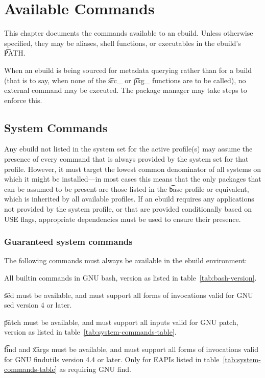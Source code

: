 \chapter{Available Commands}

This chapter documents the commands available to an ebuild. Unless otherwise specified, they may be
aliases, shell functions, or executables in the ebuild's \t{PATH}.

When an ebuild is being sourced for metadata querying rather than for a build (that is to say,
when none of the \t{src_} or \t{pkg_} functions are to be called), no external command may
be executed. The package manager may take steps to enforce this.

\section{System Commands}

Any ebuild not listed in the system set for the active profile(s) may assume the presence of every
command that is always provided by the system set for that profile. However, it must target the
lowest common denominator of all systems on which it might be installed---in most cases this means
that the only packages that can be assumed to be present are those listed in the \t{base} profile or
equivalent, which is inherited by all available profiles. If an ebuild requires any applications not
provided by the system profile, or that are provided conditionally based on USE flags, appropriate
dependencies must be used to ensure their presence.

\subsection{Guaranteed system commands}
\label{sec:guaranteed-system-commands}

The following commands must always be available in the ebuild environment:
\begin{compactitem}
\item All builtin commands in GNU bash, version as listed in table~\ref{tab:bash-version}.
\item \t{sed} must be available, and must support all forms of invocations valid for GNU sed
    version 4 or later.
\item {} \t{patch} must be available, and must support all inputs valid
    for GNU patch, version as listed in table~\ref{tab:system-commands-table}.
\item {} \t{find} and \t{xargs} must be available, and must support all forms
    of invocations valid for GNU findutils version 4.4 or later. Only for EAPIs listed in
    table~\ref{tab:system-commands-table} as requiring GNU find.
\end{compactitem}

